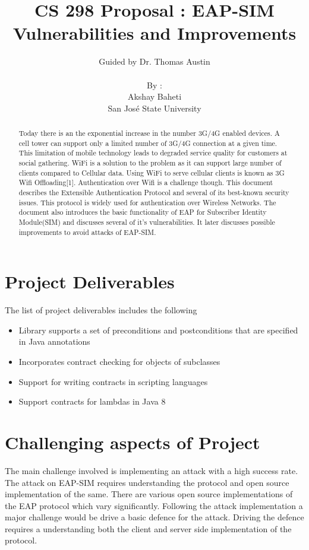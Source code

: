 \documentclass{article}
\title{CS 298 Proposal : EAP-SIM Vulnerabilities and Improvements}
\author{	
   Guided by Dr. Thomas Austin\\
   \\
   By : \\
   Akshay Baheti \\
   San Jos\'{e} State University \\
}
\begin{document}
\maketitle
\begin{abstract}
Today there is an the exponential increase in the number 3G/4G enabled devices. A cell
tower can support only a limited number of 3G/4G connection at a given time. This limitation of mobile technology leads to degraded service quality for customers at social gathering. WiFi is a solution to the problem as it can support large number of clients compared to Cellular data. Using WiFi to serve cellular clients is known as 3G Wifi Offloading[1]. Authentication over Wifi is a challenge though. This document describes the Extensible Authentication Protocol and several of its best-known security issues. This protocol is widely used for authentication over Wireless Networks. The document also introduces the basic functionality of EAP for Subscriber Identity Module(SIM) and discusses several of it's vulnerabilities. It later discusses possible improvements to avoid attacks of EAP-SIM.
\end{abstract}
\section{Project Deliverables}
\label{sec:Section 1}
The list of project deliverables includes the following
\begin{itemize}
 \item Library supports a set of preconditions and postconditions that are specified in Java annotations
 \item Incorporates contract checking for objects of subclasses
 \item Support for writing contracts in scripting languages
 \item Support contracts for lambdas in Java 8
\end{itemize}
\section{Challenging aspects of Project}
\label{sec:Section 2}
The main challenge involved is implementing an attack with a high success rate. The attack on EAP-SIM requires understanding the protocol and open source implementation of the same. There are various open source implementations of the EAP protocol which vary significantly. Following the attack implementation a major challenge would be drive a basic defence for the attack. Driving the defence requires a understanding both the client and server side implementation of the protocol.
\end{document}
